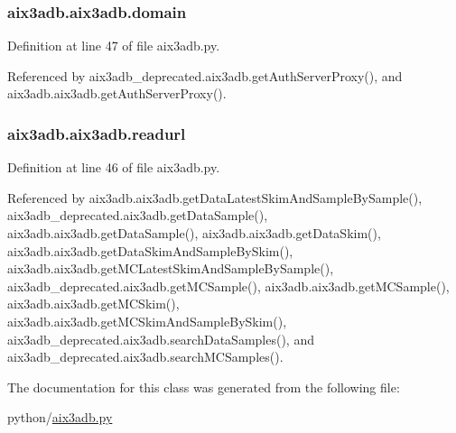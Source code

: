 \subsubsection[{domain}]{\setlength{\rightskip}{0pt plus 5cm}aix3adb.\-aix3adb.\-domain\hspace{0.3cm}{\ttfamily [inherited]}}\label{classaix3adb_1_1aix3adb_af747cd1cee6c88ff214c2837fca42a69}


Definition at line 47 of file aix3adb.\-py.



Referenced by aix3adb\-\_\-deprecated.\-aix3adb.\-get\-Auth\-Server\-Proxy(), and aix3adb.\-aix3adb.\-get\-Auth\-Server\-Proxy().

\subsubsection[{readurl}]{\setlength{\rightskip}{0pt plus 5cm}aix3adb.\-aix3adb.\-readurl\hspace{0.3cm}{\ttfamily [inherited]}}\label{classaix3adb_1_1aix3adb_aa6b9e6321ecd56b4269f7adf44cfa101}


Definition at line 46 of file aix3adb.\-py.



Referenced by aix3adb.\-aix3adb.\-get\-Data\-Latest\-Skim\-And\-Sample\-By\-Sample(), aix3adb\-\_\-deprecated.\-aix3adb.\-get\-Data\-Sample(), aix3adb.\-aix3adb.\-get\-Data\-Sample(), aix3adb.\-aix3adb.\-get\-Data\-Skim(), aix3adb.\-aix3adb.\-get\-Data\-Skim\-And\-Sample\-By\-Skim(), aix3adb.\-aix3adb.\-get\-M\-C\-Latest\-Skim\-And\-Sample\-By\-Sample(), aix3adb\-\_\-deprecated.\-aix3adb.\-get\-M\-C\-Sample(), aix3adb.\-aix3adb.\-get\-M\-C\-Sample(), aix3adb.\-aix3adb.\-get\-M\-C\-Skim(), aix3adb.\-aix3adb.\-get\-M\-C\-Skim\-And\-Sample\-By\-Skim(), aix3adb\-\_\-deprecated.\-aix3adb.\-search\-Data\-Samples(), and aix3adb\-\_\-deprecated.\-aix3adb.\-search\-M\-C\-Samples().



The documentation for this class was generated from the following file\-:\begin{DoxyCompactItemize}
\item 
python/\hyperlink{aix3adb_8py}{aix3adb.\-py}\end{DoxyCompactItemize}
